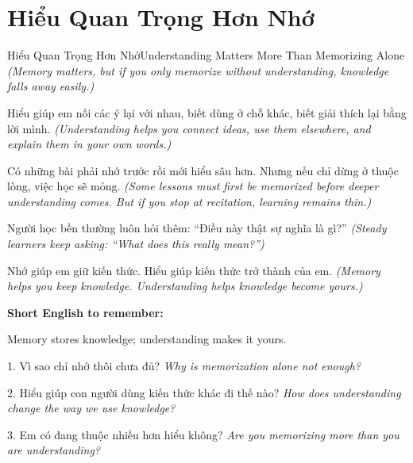 \section{Hiểu Quan Trọng Hơn Nhớ}
\begin{truyen}{Hiểu Quan Trọng Hơn Nhớ}{Understanding Matters More Than Memorizing Alone}
\textit{(Memory matters, but if you only memorize without understanding, knowledge falls away easily.)}

Hiểu giúp em nối các ý lại với nhau, biết dùng ở chỗ khác, biết giải thích lại bằng lời mình.
\textit{(Understanding helps you connect ideas, use them elsewhere, and explain them in your own words.)}

Có những bài phải nhớ trước rồi mới hiểu sâu hơn. Nhưng nếu chỉ dừng ở thuộc lòng, việc học sẽ mỏng.
\textit{(Some lessons must first be memorized before deeper understanding comes. But if you stop at recitation, learning remains thin.)}

Người học bền thường luôn hỏi thêm: “Điều này thật sự nghĩa là gì?”
\textit{(Steady learners keep asking: “What does this really mean?”)}
\end{truyen}

\begin{baihoc}
Nhớ giúp em giữ kiến thức. Hiểu giúp kiến thức trở thành của em.
\textit{(Memory helps you keep knowledge. Understanding helps knowledge become yours.)}
\end{baihoc}

\begin{ghinhoanh}
\textbf{Short English to remember:}

Memory stores knowledge; understanding makes it yours.

\end{ghinhoanh}

\begin{tuhocnhanh}
1. Vì sao chỉ nhớ thôi chưa đủ? \textit{Why is memorization alone not enough?}

2. Hiểu giúp con người dùng kiến thức khác đi thế nào? \textit{How does understanding change the way we use knowledge?}

3. Em có đang thuộc nhiều hơn hiểu không? \textit{Are you memorizing more than you are understanding?}
\end{tuhocnhanh}
\ngancach

